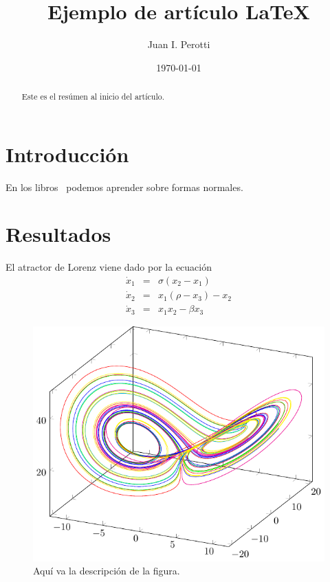 \documentclass[aps,prl,twocolumn,groupedaddress]{revtex4-2}
\begin{document}
\title{Ejemplo de artículo LaTeX}

\author{Juan I. Perotti}

\date{\today}

\begin{abstract}
Este es el resúmen al inicio del artículo.
\end{abstract}

\maketitle

\section{
\label{intro}
Introducción
}

En los libros~\cite{verhulst1985nonlinear,wiggins2003introduction} podemos aprender sobre formas normales.

\section{
\label{resultados}
Resultados
}

El atractor de Lorenz viene dado por la ecuación
\begin{eqnarray}
\label{eq1}
\dot{x}_1 &=& \sigma(x_2-x_1) \\
\dot{x}_2 &=& x_1(\rho-x_3)-x_2 \nonumber \\
\dot{x}_3 &=& x_1x_2-\beta x_3 \nonumber
\end{eqnarray}

\begin{figure}
\includegraphics*[scale=.9]{fig1.pdf}
\caption{
\label{fig1}
Aquí va la descripción de la figura.
}
\end{figure}
\end{document}
